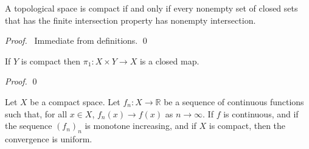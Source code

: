 \begin{prop}
  \label{prop:topology:compact:finite_intersection}
  A topological space is compact if and only if every nonempty set of closed
  sets that has the finite intersection property has nonempty intersection.
\end{prop}

\begin{proof}
  \pf\ Immediate from definitions. \qed
\end{proof}

\begin{lm}
  \label{lm:topology:compact:projection_closed}
  If $Y$ is compact then $\pi_1 : X \times Y \rightarrow X$ is a closed map.
\end{lm}

\begin{proof}
  \pf
  \qed
\end{proof}

\begin{thm}
  Let $X$ be a compact space.
  Let $f_n : X \rightarrow \mathbb{R}$ be a sequence of continuous functions
  such that, for all $x \in X$, $f_n(x) \rightarrow f(x)$ as $n \rightarrow
  \infty$. If $f$ is continuous, and if the sequence $(f_n)_n$ is monotone
  increasing, and if $X$ is compact, then the convergence is uniform.
\end{thm}

